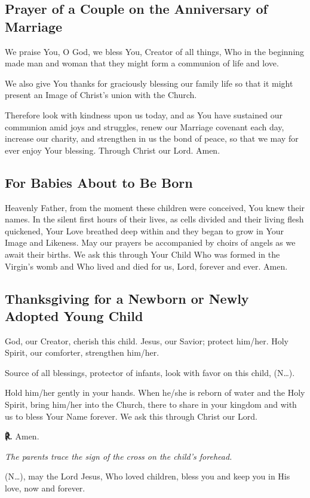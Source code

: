 \documentclass[12pt]{article}
\makeatletter
\newcommand{\prayertitle}[1]{\subsection{#1}}
\newcommand{\insertname}{(N\dots)\xspace}
\newcommand{\emphasis}[1]{\emph{#1}}
\newcommand{\emphasis}[1]{\textsl{#1}}
\newcommand{\instruction}[1]{\emphasis{#1}}
\newcommand{\response}{{\setmainfont{Times New Roman}\textbf{℟.}}\xspace}
\DeclareRobustCommand{\response}{\textbf{\vers@resp{0pt}{R}.}\xspace}
\newcommand{\vers@resp@sym}{\raisebox{0.2ex}{\rotatebox[origin=c]{-20}{$\m@th\rceil$}}}
\newcommand{\vers@resp}[2]{%
		{\ooalign{\hidewidth\kern#1\vers@resp@sym\hidewidth\cr#2\cr}}%
	}
\makeatother
\begin{document}
\prayertitle{Prayer of a Couple on the Anniversary of Marriage}
We praise You, O God, we bless You, Creator of all things, Who in the beginning made man and woman that they might form a communion of life and love.

We also give You thanks for graciously blessing our family life so that it might present an Image of Christ's union with the Church.

Therefore look with kindness upon us today, and as You have sustained our communion amid joys and struggles, renew our Marriage covenant each day, increase our charity, and strengthen in us the bond of peace, so that we may for ever enjoy Your blessing.
Through Christ our Lord. Amen.

\prayertitle{For Babies About to Be Born}
\label{prayer:babies_about_to_be_born}
Heavenly Father, from the moment these children were conceived, You knew their names.
In the silent first hours of their lives, as cells divided and their living flesh quickened, Your Love breathed deep within and they began to grow in Your Image and Likeness.
May our prayers be accompanied by choirs of angels as we await their births.
We ask this through Your Child Who was formed in the Virgin's womb and Who lived and died for us, Lord, forever and ever. Amen.

\prayertitle{Thanksgiving for a Newborn or Newly Adopted Young Child}
\label{prayer:thanksgiving_newborn}
God, our Creator, cherish this child.
Jesus, our Savior; protect him/her.
Holy Spirit, our comforter, strengthen him/her.

Source of all blessings, protector of infants, look with favor on this child, \insertname.

Hold him/her gently in your hands.
When he/she is reborn of water and the Holy Spirit, bring him/her into the Church, there to share in your kingdom and with us to bless Your Name forever.
We ask this through Christ our Lord.

\response Amen.

\instruction{The parents trace the sign of the cross on the child's forehead.}

\insertname, may the Lord Jesus, Who loved children, bless you and keep you in His love, now and forever.
\end{document}
